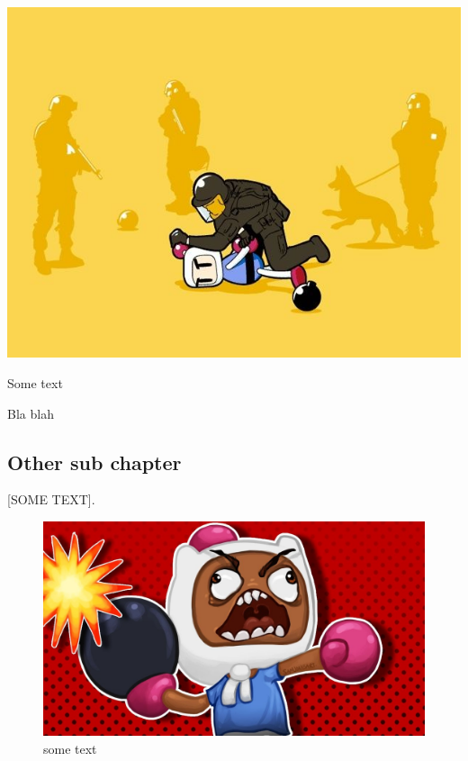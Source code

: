 \documentclass[a4paper]{article}
\begin{document}
\begin{minipage}{\columnwidth}
{\includegraphics[scale=0.1]{images/img2} }
\caption{Some text}
\label{fig-canvas}
\end{minipage}
\newline \newline\newline 
\noindent Bla blah

\subsection*{Other sub chapter}
[SOME TEXT]. 


\begin{figure}[h]
\centering
\includegraphics[scale=0.15]{images/img1} 
\caption{some text}
\label{bb-ch}
\end{figure}
\end{document}
